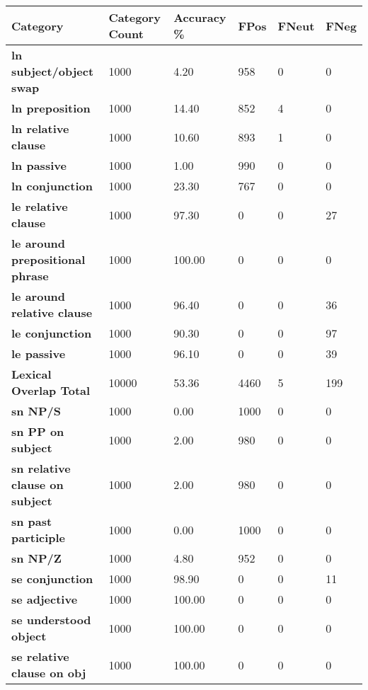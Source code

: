 \documentclass[11pt,a4paper]{article}
\begin{document}
\begin{table}[!hbt]
    \centering
    \tiny
    \centering
    \begin{tabular}{p{}|p{} p{} p{} p{} p{} }
        \textbf{Category} & \textbf{Category Count} & \textbf{Accuracy \%} & \textbf{FPos} & \textbf{FNeut} & \textbf{FNeg} \\
        \hline
        \textbf{ln subject/object swap} & 1000 & 4.20 & 958 & 0 & 0 \\
        \textbf{ln preposition} & 1000 & 14.40 & 852 & 4 & 0 \\
        \textbf{ln relative clause} & 1000 & 10.60 & 893 & 1 & 0 \\
        \textbf{ln passive} & 1000 & 1.00 & 990 & 0 & 0 \\
        \textbf{ln conjunction} & 1000 & 23.30 & 767 & 0 & 0 \\
        \textbf{le relative clause} & 1000 & 97.30 & 0 & 0 & 27 \\
        \textbf{le around prepositional phrase} & 1000 & 100.00 & 0 & 0 & 0 \\
        \textbf{le around relative clause} & 1000 & 96.40 & 0 & 0 & 36 \\
        \textbf{le conjunction} & 1000 & 90.30 & 0 & 0 & 97 \\
        \textbf{le passive} & 1000 & 96.10 & 0 & 0 & 39 \\
        \textbf{Lexical Overlap Total} & 10000 & 53.36 & 4460 & 5 & 199 \\
        \hline
        \textbf{sn NP/S} & 1000 & 0.00 & 1000 & 0 & 0 \\
        \textbf{sn PP on subject} & 1000 & 2.00 & 980 & 0 & 0 \\
        \textbf{sn relative clause on subject} & 1000 & 2.00 & 980 & 0 & 0 \\
        \textbf{sn past participle} & 1000 & 0.00 & 1000 & 0 & 0 \\
        \textbf{sn NP/Z} & 1000 & 4.80 & 952 & 0 & 0 \\
        \textbf{se conjunction} & 1000 & 98.90 & 0 & 0 & 11 \\
        \textbf{se adjective} & 1000 & 100.00 & 0 & 0 & 0 \\
        \textbf{se understood object} & 1000 & 100.00 & 0 & 0 & 0 \\
        \textbf{se relative clause on obj} & 1000 & 100.00 & 0 & 0 & 0 \\

\end{tabular}
\end{table}
\end{document}
